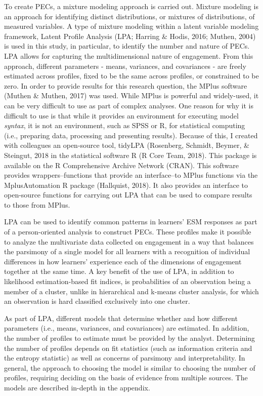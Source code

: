 \documentclass[]{book}
\theoremstyle{definition}
\theoremstyle{definition}
\theoremstyle{definition}
\theoremstyle{remark}
\begin{document}
To create PECs, a mixture modeling approach is carried out. Mixture
modeling is an approach for identifying distinct distributions, or
mixtures of distributions, of measured variables. A type of mixture
modeling within a latent variable modeling framework, Latent Profile
Analysis (LPA; Harring \& Hodis, 2016; Muthen, 2004) is used in this
study, in particular, to identify the number and nature of PECs. LPA
allows for capturing the multidimensional nature of engagement. From
this approach, different parameters - means, variances, and covariances
- are freely estimated across profiles, fixed to be the same across
profiles, or constrained to be zero. In order to provide results for
this research question, the MPlus software (Muthen \& Muthen, 2017) was
used. While MPlus is powerful and widely-used, it can be very difficult
to use as part of complex analyses. One reason for why it is difficult
to use is that while it provides an environment for executing model
\emph{syntax}, it is not an environment, such as SPSS or R, for
statistical computing (i.e., preparing data, processing and presenting
results). Because of this, I created with colleagues an open-source
tool, tidyLPA (Rosenberg, Schmidt, Beymer, \& Steingut, 2018 in the
statistical software R (R Core Team, 2018). This package is available on
the R Comprehensive Archive Network (CRAN). This software provides
wrappers--functions that provide an interface--to MPlus functions via
the MplusAutomation R package (Hallquist, 2018). It also provides an
interface to open-source functions for carrying out LPA that can be used
to compare results to those from MPlus.

LPA can be used to identify common patterns in learners' ESM responses
as part of a person-oriented analysis to construct PECs. These profiles
make it possible to analyze the multivariate data collected on
engagement in a way that balances the parsimony of a single model for
all learners with a recognition of individual differences in how
learners' experience each of the dimensions of engagement together at
the same time. A key benefit of the use of LPA, in addition to
likelihood estimation-based fit indices, is probabilities of an
observation being a member of a cluster, unlike in hierarchical and
k-means cluster analysis, for which an observation is hard classified
exclusively into one cluster.

As part of LPA, different models that determine whether and how
different parameters (i.e., means, variances, and covariances) are
estimated. In addition, the number of profiles to estimate must be
provided by the analyst. Determining the number of profiles depends on
fit statistics (such as information criteria and the entropy statistic)
as well as concerns of parsimony and interpretability. In general, the
approach to choosing the model is similar to choosing the number of
profiles, requiring deciding on the basis of evidence from multiple
sources. The models are described in-depth in the appendix.
\end{document}
